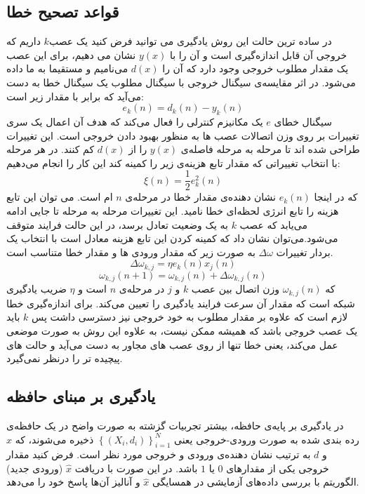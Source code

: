 \documentclass[11pt,a4paper,twocolumn]{article}
\begin{document}
\subsection{قواعد تصحیح خطا}
در ساده ترین حالت این روش یادگیری می ‌توانید فرض کنید یک عصب$k$  داریم که خروجی آن قابل اندازه‌گیری است و آن را با $y(x)$ نشان می دهیم، برای این عصب یک مقدار مطلوب خروجی وجود دارد که آن را $d(x)$ می‌نامیم و مستقیما به ما داده می‌شود. در اثر مقایسه‌ی سیگنال خروجی با سیگنال مطلوب یک سیگنال خطا به دست می‌آید که برابر با مقدار زیر است:
$$e_k(n) = d_k(n) - y_k(n)$$
سیگنال خطای $e$ یک مکانیزم کنترلی را فعال می‌کند که هدف آن اعمال یک سری تغییرات بر روی وزن اتصالات عصب ها به منظور بهبود دادن خروجی است. این تغییرات طراحی شده اند تا مرحله به مرحله فاصله‌ی $y(x)$ را از $d(x)$ کم کنند. در هر مرحله با انتخاب تغییراتی که مقدار تابع هزینه‌ی زیر را کمینه کند این کار را انجام می‌دهیم:
$$\xi(n) = \frac{1}{2}e_k^2(n)$$
که در اینجا $e_k(n)$ نشان دهنده‌ی مقدار خطا در مرحله‌ی $n$ ام است.  می توان این تابع هزینه را تابع انرژی لحظه‌ای خطا نامید. این تغییرات مرحله به مرحله تا جایی ادامه می‌یابد که عصب $k$ به یک وضعیت تعادل برسد، در این حالت فرایند متوقف می‌شود.می‌توان نشان داد که کمینه کردن این تابع هزینه معادل است با انتخاب یک بردار تغییرات
$\Delta \omega$
به صورت زیر که  مقدار ورودی ها و مقدار خطا متناسب است.
$$\Delta \omega_{k,j} = \eta e_k(n)x_j(n)$$
$$\omega_{k,j}(n+1) = \omega_{k,j}(n) + \Delta \omega_{k,j}(n)$$
که $\omega_{k,j}(n)$ وزن اتصال بین عصب $k$ و $j$  در مرحله‌ی $n$ است و $\eta$ ضریب یادگیری شبکه است که مقدار آن سرعت فرایند یادگیری را تعیین می‌کند.
برای اندازه‌گیری خطا لازم است که علاوه بر مقدار مطلوب به خود خروجی نیز دسترسی داشت پس $k$ باید یک عصب خروجی باشد که همیشه ممکن نیست، به علاوه این روش به صورت موضعی عمل می‌کند، یعنی خطا تنها از روی عصب های مجاور به دست می‌آید و حالت های پیچیده تر را درنظر نمی‌گیرد.
\subsection{یادگیری بر مبنای حافظه}
در یادگیری بر پایه‌ی حافظه، بیشتر تجربیات گزشته به صورت واضح در یک حافظه‌ی رده بندی شده به صورت ورودی-خروجی یعنی
$\left\{ (X_i, d_i) \right\}_{i=1}^N$
ذخیره می‌شوند، که $x$ و $d$ به ترتیب نشان دهنده‌ی ورودی و خروجی مورد نظر است. فرض کنید مقدار خروجی یکی از مقدار‌های $0$ یا $1$ باشد. در این صورت با دریافت
$\widehat x$
(ورودی جدید) الگوریتم با بررسی داده‌های آزمایشی در همسایگی
$\widehat x$
و  آنالیز آن‌ها پاسخ خود را می‌دهد.
\end{document}
